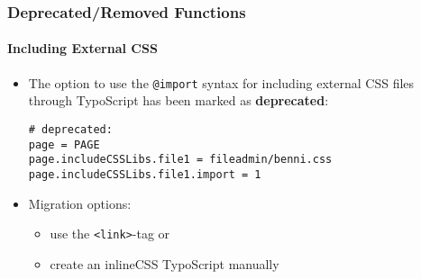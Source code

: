%

\begin{frame}[fragile]
	\frametitle{Deprecated/Removed Functions}
	\framesubtitle{Including External CSS}


	\begin{itemize}
		\item The option to use the \texttt{@import} syntax for including external
			CSS files through TypoScript has been marked as \textbf{deprecated}:
\begin{lstlisting}
# deprecated:
page = PAGE
page.includeCSSLibs.file1 = fileadmin/benni.css
page.includeCSSLibs.file1.import = 1
\end{lstlisting}
		\item Migration options:
			\begin{itemize}
				\item use the \texttt{<link>}-tag or
				\item create an inlineCSS TypoScript manually
			\end{itemize}
	\end{itemize}

\end{frame}

